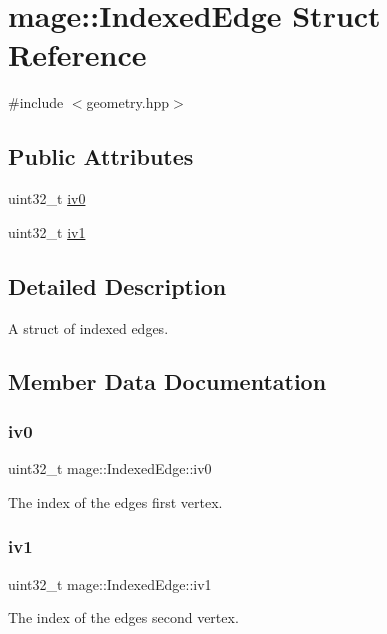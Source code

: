 \hypertarget{structmage_1_1_indexed_edge}{}\section{mage\+:\+:Indexed\+Edge Struct Reference}
\label{structmage_1_1_indexed_edge}


{\ttfamily \#include $<$geometry.\+hpp$>$}

\subsection*{Public Attributes}
\begin{DoxyCompactItemize}
\item 
uint32\+\_\+t \hyperlink{structmage_1_1_indexed_edge_a2d9717dccad8876af7492f0952cf7097}{iv0}
\item 
uint32\+\_\+t \hyperlink{structmage_1_1_indexed_edge_ad01e125a7beee86ea885625e9db9b8d7}{iv1}
\end{DoxyCompactItemize}


\subsection{Detailed Description}
A struct of indexed edges. 

\subsection{Member Data Documentation}
\hypertarget{structmage_1_1_indexed_edge_a2d9717dccad8876af7492f0952cf7097}{}\label{structmage_1_1_indexed_edge_a2d9717dccad8876af7492f0952cf7097} 
\subsubsection{\texorpdfstring{iv0}{iv0}}
{\footnotesize\ttfamily uint32\+\_\+t mage\+::\+Indexed\+Edge\+::iv0}

The index of the edge\textquotesingle{}s first vertex. \hypertarget{structmage_1_1_indexed_edge_ad01e125a7beee86ea885625e9db9b8d7}{}\label{structmage_1_1_indexed_edge_ad01e125a7beee86ea885625e9db9b8d7} 
\subsubsection{\texorpdfstring{iv1}{iv1}}
{\footnotesize\ttfamily uint32\+\_\+t mage\+::\+Indexed\+Edge\+::iv1}

The index of the edge\textquotesingle{}s second vertex. 